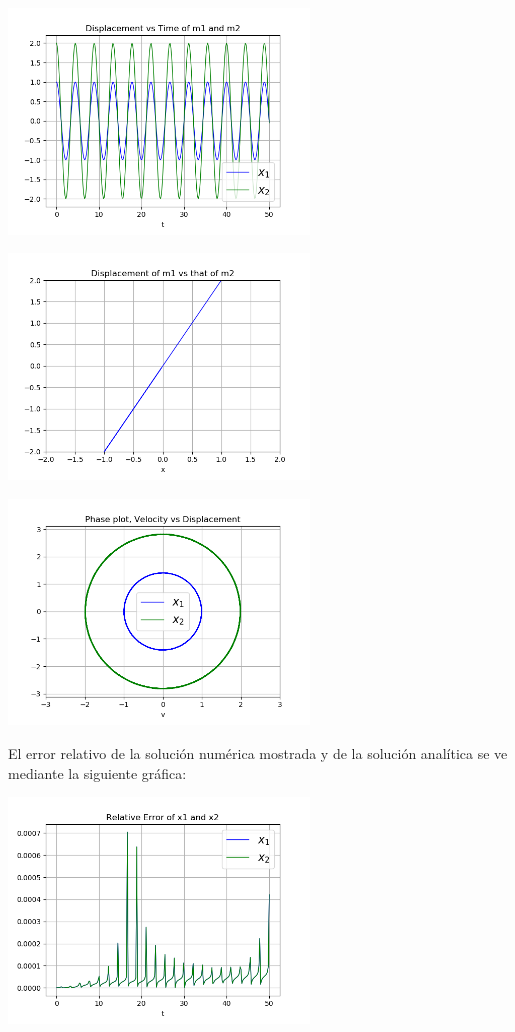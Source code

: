 \documentclass[a4paper]{article}
\begin{document}
\begin{center}
\includegraphics[height=6cm]{ejemplo2-1.png}

\includegraphics[height=6cm]{recta2-1.png}

\includegraphics[height=6cm]{circulo2-1.png}

\end{center}

El error relativo de la solución numérica mostrada y de la solución analítica se ve mediante la siguiente gráfica:

\begin{center}
\includegraphics[height=6cm]{error2-1.png}
\end{center}
\end{document}
